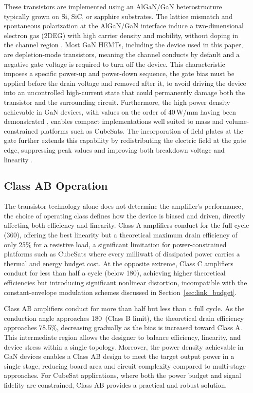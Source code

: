 These transistors are implemented using an AlGaN/GaN heterostructure typically grown on Si, SiC, or sapphire substrates. The lattice mismatch and spontaneous polarization at the AlGaN/GaN interface induce a two-dimensional electron gas (2DEG) with high carrier density and mobility, without doping in the channel region \cite{Ambacher2000}. Most GaN HEMTs, including the device used in this paper, are depletion-mode transistors, meaning the channel conducts by default and a negative gate voltage is required to turn off the device. This characteristic imposes a specific power-up and power-down sequence, the gate bias must be applied before the drain voltage and removed after it, to avoid driving the device into an uncontrolled high-current state that could permanently damage both the transistor and the surrounding circuit. Furthermore, the high power density achievable in GaN devices, with values on the order of 40\,W/mm having been demonstrated \cite{Wu2006}, enables compact implementations well suited to mass and volume-constrained platforms such as CubeSats. The incorporation of field plates at the gate further extends this capability by redistributing the electric field at the gate edge, suppressing peak values and improving both breakdown voltage and linearity \cite{Chiang2012}.

\subsection{Class AB Operation}
The transistor technology alone does not determine the amplifier's performance, the choice of operating class defines how the device is biased and driven, directly affecting both efficiency and linearity. Class A amplifiers conduct for the full cycle (360\degree), offering the best linearity but a theoretical maximum drain efficiency of only 25\% for a resistive load, a significant limitation for power-constrained platforms such as CubeSats where every milliwatt of dissipated power carries a thermal and energy budget cost. At the opposite extreme, Class C amplifiers conduct for less than half a cycle (below 180\degree), achieving higher theoretical efficiencies but introducing significant nonlinear distortion, incompatible with the constant-envelope modulation schemes discussed in Section~\ref{sec:link_budget}.

Class AB amplifiers conduct for more than half but less than a full cycle. As the conduction angle approaches 180\degree\ (Class B limit), the theoretical drain efficiency approaches 78.5\%, decreasing gradually as the bias is increased toward Class A. This intermediate region allows the designer to balance efficiency, linearity, and device stress within a single topology. Moreover, the power density achievable in GaN devices enables a Class AB design to meet the target output power in a single stage, reducing board area and circuit complexity compared to multi-stage approaches. For CubeSat applications, where both the power budget and signal fidelity are constrained, Class AB provides a practical and robust solution. 

